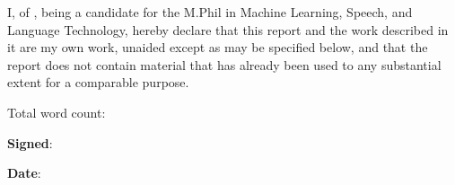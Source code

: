 
\makeatletter
\begin{declaration}

I, \@author{} of \@college{}, being a candidate for the M.Phil in Machine Learning,
Speech, and Language Technology, hereby declare that this report and the work
described in it are my own work, unaided except as may be specified below, and
that the report does not contain material that has already been used to any
substantial extent for a comparable purpose.

\vspace{24pt}
Total word count: \wordcount

\vspace{60pt}
\textbf{Signed}:

\vspace{24pt}
\textbf{Date}:
\vspace{60pt}


\end{declaration}
\makeatother
